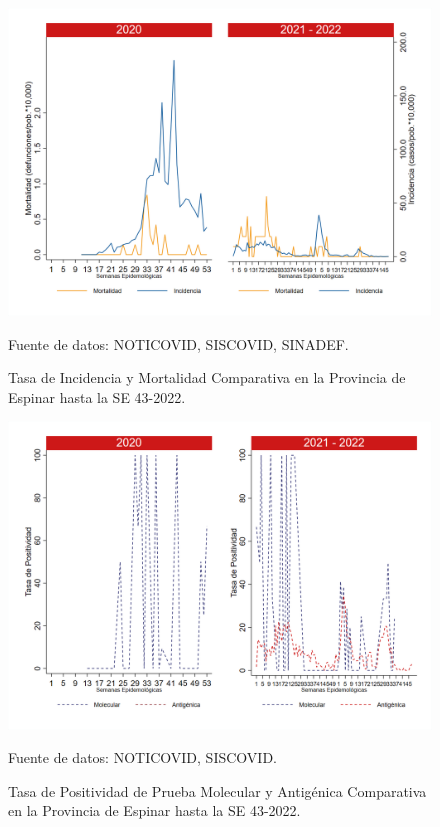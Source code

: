 \documentclass[12pt,a4paper,openany]{book}
\begin{document}
	\begin{figure}[h]
		\caption{Tasa de Incidencia y Mortalidad Comparativa en la Provincia de Espinar hasta la SE 43-2022.}\label{fig:inc_mort_espinar}
		\begin{center}
			\includegraphics[width=0.85\linewidth]{../figuras/incidencia_mortalidad_20_21_8.png}
		\end{center}
		{\footnotesize {Fuente de datos: NOTICOVID, SISCOVID, SINADEF.}}
	\end{figure}
	
	\begin{figure}[h]
		\caption{Tasa de Positividad de Prueba Molecular y Antigénica Comparativa en la Provincia de Espinar hasta la SE 43-2022.}\label{fig:positividad_espinar}
		\begin{center}
			\includegraphics[width=0.7\linewidth]{../figuras/positividad_20_21_8.png}
		\end{center}
		{\footnotesize {Fuente de datos: NOTICOVID, SISCOVID.}}
	\end{figure}
	
\end{document}
